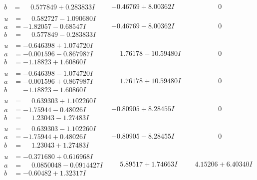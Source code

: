 \documentclass[1p]{elsarticle_modified}
\theoremstyle{definition}
\begin{document}
$$\begin{array}{c|c|c}
\begin{aligned}
b &= \phantom{-}0.577849 + 0.283833 I\end{aligned}
 & -0.46769 + 8.00362 I & \phantom{-0.000000 } 0 \\ \hline\begin{aligned}
u &= \phantom{-}0.582727 - 1.090680 I \\
a &= -1.82057 - 0.68547 I \\
b &= \phantom{-}0.577849 - 0.283833 I\end{aligned}
 & -0.46769 - 8.00362 I & \phantom{-0.000000 } 0 \\ \hline\begin{aligned}
u &= -0.646398 + 1.074720 I \\
a &= -0.001596 - 0.867987 I \\
b &= -1.18823 + 1.60860 I\end{aligned}
 & \phantom{-}1.76178 - 10.59480 I & \phantom{-0.000000 } 0 \\ \hline\begin{aligned}
u &= -0.646398 - 1.074720 I \\
a &= -0.001596 + 0.867987 I \\
b &= -1.18823 - 1.60860 I\end{aligned}
 & \phantom{-}1.76178 + 10.59480 I & \phantom{-0.000000 } 0 \\ \hline\begin{aligned}
u &= \phantom{-}0.639303 + 1.102260 I \\
a &= -1.75944 - 0.48026 I \\
b &= \phantom{-}1.23043 - 1.27483 I\end{aligned}
 & -0.80905 + 8.28455 I & \phantom{-0.000000 } 0 \\ \hline\begin{aligned}
u &= \phantom{-}0.639303 - 1.102260 I \\
a &= -1.75944 + 0.48026 I \\
b &= \phantom{-}1.23043 + 1.27483 I\end{aligned}
 & -0.80905 - 8.28455 I & \phantom{-0.000000 } 0 \\ \hline\begin{aligned}
u &= -0.371680 + 0.616968 I \\
a &= \phantom{-}0.0850048 - 0.0914427 I \\
b &= -0.60482 + 1.32317 I\end{aligned}
 & \phantom{-}5.89517 + 1.74663 I & \phantom{-}4.15206 + 6.40340 I \\ \hline\begin{aligned}

\end{aligned}
\end{array}$$
\end{document}
